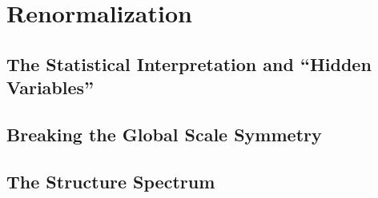 \section{Renormalization}

\subsection{The Statistical Interpretation and ``Hidden Variables''}

\subsection{Breaking the Global Scale Symmetry}

\subsection{The Structure Spectrum}
